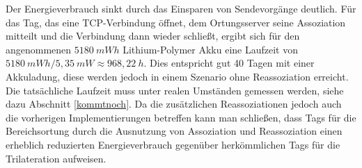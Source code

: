 Der Energieverbrauch sinkt durch das Einsparen von Sendevorgänge deutlich.
Für das Tag, das eine TCP-Verbindung öffnet, dem Ortungsserver seine Assoziation mitteilt und die Verbindung dann wieder schließt, ergibt sich für den angenommenen $5180\ mWh$ Lithium-Polymer Akku eine Laufzeit von $5180\ mWh/5,35\ mW \approx 968,22\ h$. 
Dies entspricht gut 40 Tagen mit einer Akkuladung, diese werden jedoch in einem Szenario ohne Reassoziation erreicht.
Die tatsächliche Laufzeit muss unter realen Umständen gemessen werden, siehe dazu Abschnitt \ref{kommtnoch}.
Da die zusätzlichen Reassoziationen jedoch auch die vorherigen Implementierungen betreffen kann man schließen, dass Tags für die Bereichsortung durch die Ausnutzung von Assoziation und Reassoziation einen erheblich reduzierten Energieverbrauch gegenüber herkömmlichen Tags für die Trilateration aufweisen.




